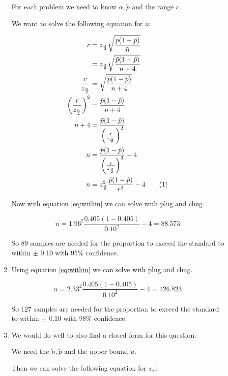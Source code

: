 \documentclass[12pt,letterpaper]{article}
\newcommand\numberthis{\refstepcounter{equation}\tag{\theequation}}
\begin{document}
\begin{enumerate}
\begin{enumerate}
\begin{enumerate}[label=(\arabic*)]
              For each problem we need to know $\alpha, \tilde{p}$ and the range $r$.

              We want to solve the following equation for $n$:

              \begin{align*}
                r &= z_{\frac{\alpha}{2}} \sqrt{\frac{\tilde{p}(1 - \tilde{p})}{\tilde{n}}} \\
                &= z_{\frac{\alpha}{2}} \sqrt{\frac{\tilde{p}(1 - \tilde{p})}{n + 4}} \\
                \frac{r}{z_{\frac{\alpha}{2}}} &= \sqrt{\frac{\tilde{p}(1 - \tilde{p})}{n + 4}} \\
                \left(\frac{r}{z_{\frac{\alpha}{2}}}\right)^2 &= \frac{\tilde{p}(1 - \tilde{p})}{n + 4} \\
                n + 4 &= \frac{\tilde{p}(1 - \tilde{p})}{\left(\frac{r}{z_{\frac{\alpha}{2}}}\right)^2} \\
                n &= \frac{\tilde{p}(1 - \tilde{p})}{\left(\frac{r}{z_{\frac{\alpha}{2}}}\right)^2} - 4 \\
                n &= z_{\frac{\alpha}{2}}^2 \frac{\tilde{p}(1 - \tilde{p})}{r^2} - 4 \numberthis \label{eq:within} \\
              \end{align*}

              Now with equation \ref{eq:within} we can solve with plug and chug.

              \[
                n = 1.96^2 \frac{0.405(1 - 0.405)}{0.10^2} - 4 = 88.573
              \]

              So 89 samples are needed for the proportion to exceed the standard to within $\pm$ 0.10 with 95\% confidence.
            \item
              Using equation \ref{eq:within} we can solve with plug and chug.

              \[
                n = 2.33^2 \frac{0.405(1 - 0.405)}{0.10^2} - 4 = 126.823
              \]

              So 127 samples are needed for the proportion to exceed the standard to within $\pm$ 0.10 with 98\% confidence.
            \item
              We would do well to also find a closed form for this question.

              We need the $\tilde{n}, \tilde{p}$ and the upper bound $u$.

              Then we can solve the following equation for $z_\alpha$:


\end{enumerate}
\end{enumerate}
\end{enumerate}
\end{document}
